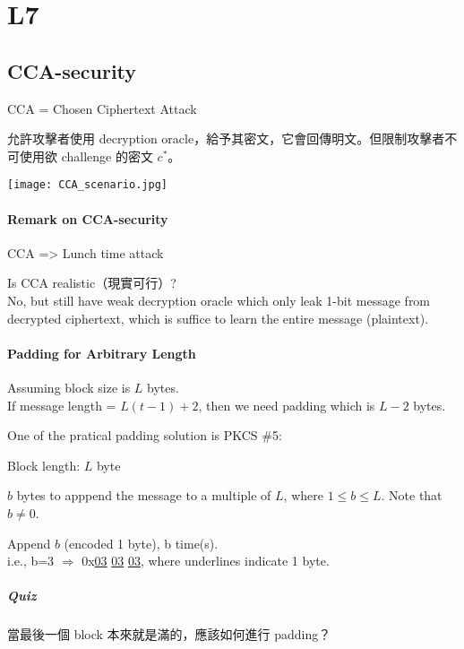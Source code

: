 \section{L7}


\subsection{CCA-security}

CCA = Chosen Ciphertext Attack

允許攻擊者使用 decryption oracle，給予其密文，它會回傳明文。但限制攻擊者不可使用欲 challenge 的密文 \(c^\ast\)。
\begin{center}
	\texttt{[image: CCA\_scenario.jpg]}
\end{center}


\paragraph{Remark on CCA-security}

CCA => Lunch time attack

Is CCA realistic（現實可行）? \\
No, but still have weak decryption oracle which only leak 1-bit message from decrypted ciphertext, which is suffice to learn the entire message (plaintext).


\paragraph{Padding for Arbitrary Length}

Assuming block size is \(L\) bytes. \\
If message length = \(L(t-1)+2\), then we need padding which is \(L-2\) bytes.

One of the pratical padding solution is PKCS \#5:
\begin{myItemize}
	\item Block length: \(L\) byte
	\item \(b\) bytes to apppend the message to a multiple of \(L\), where \(1 \leq b \leq L\). Note that \(b \neq 0\).
	\item Append \(b\) (encoded 1 byte), b time(s). \\
	i.e., b=3 \(\Rightarrow\) 0x\underline{03} \underline{03} \underline{03}, where underlines indicate 1 byte.
\end{myItemize}

\subparagraph{Quiz}

當最後一個 block 本來就是滿的，應該如何進行 padding？

